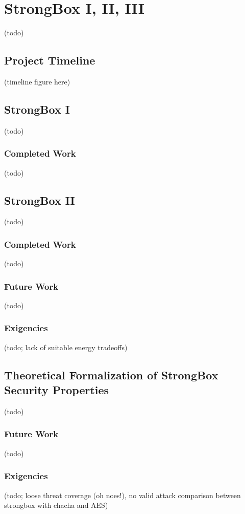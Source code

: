 \chapter{StrongBox I, II, III} \label{chp:strongbox}

(todo)

\section{Project Timeline}

(timeline figure here)

\section{StrongBox I}

(todo)

\subsection{Completed Work}

(todo)

\section{StrongBox II}

(todo)

\subsection{Completed Work}

(todo)

\subsection{Future Work}

(todo)

\subsection{Exigencies}

(todo; lack of suitable energy tradeoffs)

\section{Theoretical Formalization of StrongBox Security Properties}

(todo)

\subsection{Future Work}

(todo)

\subsection{Exigencies}

(todo; loose threat coverage (oh noes!), no valid attack comparison between
strongbox with chacha and AES)
